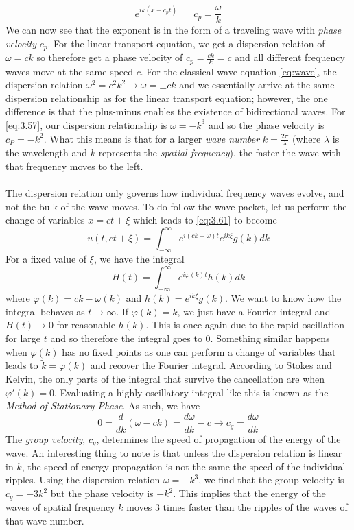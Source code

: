 \documentclass{article}
\newcommand{\od}[2]{\frac{d #1}{d #2}}
\numberwithin{equation}{section}
\begin{document}
\begin{equation}
    e^{ik(x-c_pt)} \hspace{20pt} c_p =\frac{\omega}{k}
\end{equation}
We can now see that the exponent is in the form of a traveling wave with \textit{phase velocity} $c_p$. For the linear transport equation, we get a dispersion relation of $\omega = ck$ so therefore get a phase velocity of $c_p = \frac{ck}{k} = c$ and all different frequency waves move at the same speed $c$. For the classical wave equation \eqref{eq:wave}, the dispersion relation $\omega ^2 = c^2k^2 \rightarrow \omega=\pm ck$ and we essentially arrive at the same dispersion relationship as for the linear transport equation; however, the one difference is that the plus-minus enables the existence of bidirectional waves. For \eqref{eq:3.57}, our dispersion relationship is $\omega = -k^3$ and so the phase velocity is $c_P = -k^2$. What this means is that for a larger \textit{wave number} $k=\frac{2\pi}{\lambda}$ (where $\lambda$ is the wavelength and $k$ represents the \textit{spatial frequency}), the faster the wave with that frequency moves to the left. \\\\
The dispersion relation only governs how individual frequency waves evolve, and not the bulk of the wave moves. To do follow the wave packet, let us perform the change of variables $x=ct+\xi$ which leads to \eqref{eq:3.61} to become 
\begin{equation}
    u(t,ct +\xi) =\int^\infty_{-\infty} e^{i(ck-\omega)t}e^{ik\xi}g(k) dk
\end{equation}
For a fixed value of $\xi$, we have the integral 
\begin{equation}
    H(t) = \int^\infty_{-\infty} e^{i\varphi (k)t}h(k)dk
\end{equation}
where $\varphi(k) =ck-\omega(k)$ and $h(k) =e^{ik\xi}g(k)$. We want to know how the integral behaves as $t\rightarrow \infty$. If $\varphi(k) =k$, we just have a Fourier integral and $H(t)\rightarrow0$ for reasonable $h(k)$. This is once again due to the rapid oscillation for large $t$ and so therefore the integral goes to 0. Something similar happens when $\varphi(k)$ has no fixed points as one can perform a change of variables that leads to $\tilde{k} =\varphi(k)$ and recover the Fourier integral. According to Stokes and Kelvin, the only parts of the integral that survive the cancellation are when $\varphi'(k) =0$. Evaluating a highly oscillatory integral like this is known as the \textit{Method of Stationary Phase}. As such, we have 
\begin{equation}
    0 =\od{}{k}(\omega-ck) =\od{\omega}{k} -c \rightarrow c_g=\od{\omega}{k}
\end{equation}
The \textit{group velocity}, $c_g$, determines the speed of propagation of the energy of the wave. An interesting thing to note is that unless the dispersion relation is linear in $k$, the speed of energy propagation is not the same the speed of the individual ripples. Using the dispersion relation $\omega = -k^3$, we find that the group velocity is $c_g =-3k^2$ but the phase velocity is $-k^2$. This implies that the energy of the waves of spatial frequency $k$ moves 3 times faster than the ripples of the waves of that wave number. 
\end{document}
